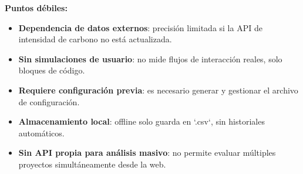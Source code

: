 \documentclass[12pt,a4paper]{report}
\begin{document}
\textbf{Puntos débiles:}
\begin{itemize}
  \item \textbf{Dependencia de datos externos}: precisión limitada si la API de intensidad de carbono no está actualizada.
  \item \textbf{Sin simulaciones de usuario}: no mide flujos de interacción reales, solo bloques de código.
  \item \textbf{Requiere configuración previa}: es necesario generar y gestionar el archivo de configuración.
  \item \textbf{Almacenamiento local}: offline solo guarda en `.csv`, sin historiales automáticos.
  \item \textbf{Sin API propia para análisis masivo}: no permite evaluar múltiples proyectos simultáneamente desde la web.
\end{itemize}
\end{document}
